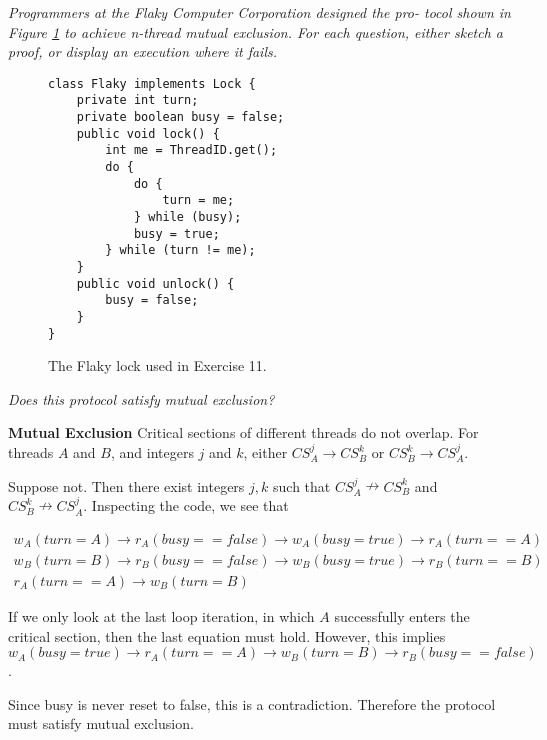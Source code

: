 \documentclass[a4paper,10pt]{article}
\begin{document}
\emph{Programmers at the Flaky Computer Corporation designed the pro-
tocol shown in Figure \ref{fig:flaky} to achieve n-thread mutual exclusion. For each question,
either sketch a proof, or display an execution where it fails.}

\begin{figure}
\begin{lstlisting}
class Flaky implements Lock {
    private int turn;
    private boolean busy = false;
    public void lock() {
        int me = ThreadID.get();
        do {
            do {
                turn = me;
            } while (busy);
            busy = true;
        } while (turn != me);
    }
    public void unlock() {
        busy = false;
    }
}
\end{lstlisting}
\caption{The Flaky lock used in Exercise 11.}
\label{fig:flaky}
\end{figure}

\emph{Does this protocol satisfy mutual exclusion?}

\vspace{3mm}

\textbf{Mutual Exclusion} Critical sections of different threads do not overlap. For
threads $A$ and $B$, and integers $j$ and $k$, either $CS_A^j \rightarrow CS_B^k$ or $CS_B^k \rightarrow CS_A^j$.

\vspace{3mm}

Suppose not. Then there exist integers $j, k$ such that $CS_A^j \nrightarrow CS_B^k$ and
$CS_B^k \nrightarrow CS_A^j$. Inspecting the code, we see that

\begin{gather*}
w_A(turn = A) \rightarrow r_A(busy == false) \rightarrow w_A(busy = true) \rightarrow r_A(turn == A) \\
w_B(turn = B) \rightarrow r_B(busy == false) \rightarrow w_B(busy = true) \rightarrow r_B(turn == B) \\
r_A(turn == A) \rightarrow w_B(turn = B)
\end{gather*}

If we only look at the last loop iteration, in which $A$ successfully enters the critical
section, then the last equation must hold. However, this implies
$w_A(busy = true) \rightarrow r_A(turn == A) \rightarrow w_B(turn = B) \rightarrow r_B(busy == false)$.

Since busy is never reset to false, this is a contradiction. 
Therefore the protocol must satisfy mutual exclusion.

\vspace{3mm}
\end{document}
